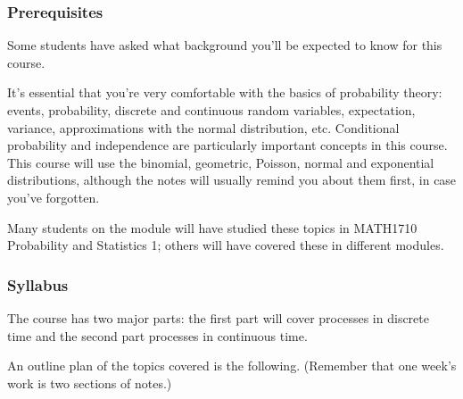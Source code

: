 \documentclass[
  a4paper,
]{article}
\theoremstyle{definition}
\theoremstyle{definition}
\theoremstyle{definition}
\theoremstyle{remark}
\begin{document}
\hypertarget{prereqs}{%
\subsubsection*{Prerequisites}\label{prereqs}}

Some students have asked what background you'll be expected to know for this course.

It's essential that you're very comfortable with the basics of probability theory: events, probability, discrete and continuous random variables, expectation, variance, approximations with the normal distribution, etc. Conditional probability and independence are particularly important concepts in this course. This course will use the binomial, geometric, Poisson, normal and exponential distributions, although the notes will usually remind you about them first, in case you've forgotten.

Many students on the module will have studied these topics in MATH1710 Probability and Statistics 1; others will have covered these in different modules.

\hypertarget{syllabus}{%
\subsubsection*{Syllabus}\label{syllabus}}

The course has two major parts: the first part will cover processes in discrete time and the second part processes in continuous time.

An outline plan of the topics covered is the following. (Remember that one week's work is two sections of notes.)
\end{document}
